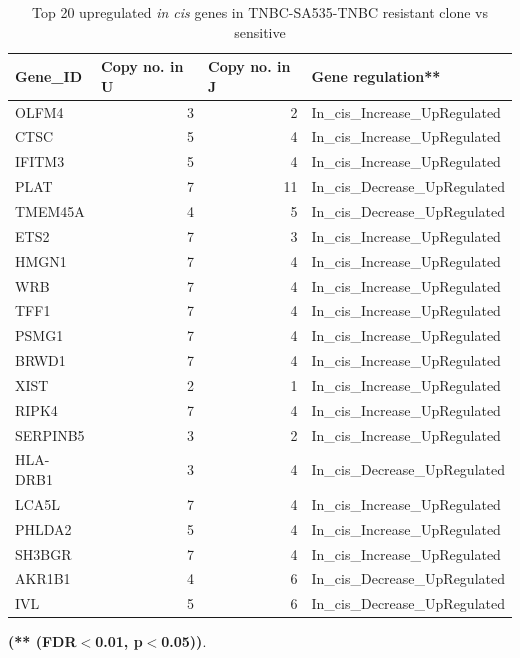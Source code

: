  \begin{table}[htbp]
   \centering
   \caption{Top 20 upregulated \textit{in cis} genes in TNBC-SA535-TNBC  resistant clone vs sensitive}
     \begin{tabular}{|l|r|r|l|}
     \hline
     \textbf{Gene\_ID} & \multicolumn{1}{|l|}{\textbf{Copy no. in  U} }& \multicolumn{1}{|l|}{\textbf{Copy no. in  J}} & \textbf{Gene regulation**} \\
     \hline
     OLFM4 & 3 & 2 & In\_cis\_Increase\_UpRegulated \\
     CTSC & 5 & 4 & In\_cis\_Increase\_UpRegulated \\
     IFITM3 & 5 & 4 & In\_cis\_Increase\_UpRegulated \\
     PLAT & 7 & 11 & In\_cis\_Decrease\_UpRegulated \\
     TMEM45A & 4 & 5 & In\_cis\_Decrease\_UpRegulated \\
     ETS2 & 7 & 3 & In\_cis\_Increase\_UpRegulated \\
     HMGN1 & 7 & 4 & In\_cis\_Increase\_UpRegulated \\
     WRB & 7 & 4 & In\_cis\_Increase\_UpRegulated \\
     TFF1 & 7 & 4 & In\_cis\_Increase\_UpRegulated \\
     PSMG1 & 7 & 4 & In\_cis\_Increase\_UpRegulated \\
     BRWD1 & 7 & 4 & In\_cis\_Increase\_UpRegulated \\
     XIST & 2 & 1 & In\_cis\_Increase\_UpRegulated \\
     RIPK4 & 7 & 4 & In\_cis\_Increase\_UpRegulated \\
     SERPINB5 & 3 & 2 & In\_cis\_Increase\_UpRegulated \\
     HLA-DRB1 & 3 & 4 & In\_cis\_Decrease\_UpRegulated \\
     LCA5L & 7 & 4 & In\_cis\_Increase\_UpRegulated \\
     PHLDA2 & 5 & 4 & In\_cis\_Increase\_UpRegulated \\
     SH3BGR & 7 & 4 & In\_cis\_Increase\_UpRegulated \\
     AKR1B1 & 4 & 6 & In\_cis\_Decrease\_UpRegulated \\
     IVL & 5 & 6 & In\_cis\_Decrease\_UpRegulated \\
     \hline
     \end{tabular}%
   \label{tab:top20SA535upregulatedCX}%
 
  \small\textbf{(** (FDR$<$0.01, p$<$0.05))}.

 \end{table}%





